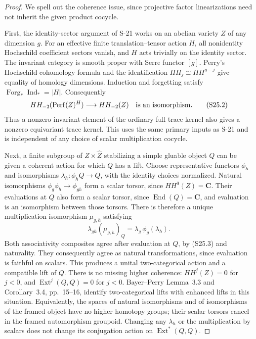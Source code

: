 \begin{proof}
We spell out the coherence issue, since projective factor
linearizations need not inherit the given product cocycle.

First, the identity-sector argument of S-21 works on an
abelian variety $Z$ of any dimension $g$. For an effective
finite translation--tensor action $H$, all nonidentity
Hochschild coefficient sectors vanish, and $H$ acts
trivially on the identity sector. The invariant category
is smooth proper with Serre functor $[g]$. Perry's
Hochschild-cohomology formula and the identification
$HH_j\cong HH^{g-j}$ give equality of homology dimensions.
Induction and forgetting satisfy
$\operatorname{Forg}_*\operatorname{Ind}_*=|H|$.
Consequently
\[
 HH_{-2}(\operatorname{Perf}(Z)^H)
   \longrightarrow HH_{-2}(Z)
 \quad\hbox{is an isomorphism}.
 \tag{S25.2}
\]
Thus a nonzero invariant element of the ordinary full
trace kernel also gives a nonzero equivariant trace kernel.
This uses the same primary inputs as S-21 and is
independent of any choice of scalar multiplication cocycle.

Next, a finite subgroup of $Z\times\widehat Z$ stabilizing
a simple gluable object $Q$ can be given a coherent action
for which $Q$ has a lift. Choose representative functors
$\phi_h$ and isomorphisms $\lambda_h:\phi_hQ\to Q$,
with the identity choices normalized. Natural isomorphisms
$\phi_g\phi_h\to\phi_{gh}$ form a scalar torsor,
since $HH^0(Z)=\mathbf C$. Their evaluations at $Q$ also
form a scalar torsor, since $\operatorname{End}(Q)=\mathbf C$,
and evaluation is an isomorphism between those torsors.
There is therefore a unique multiplication isomorphism
$\mu_{g,h}$ satisfying
\[
 \lambda_{gh}(\mu_{g,h})_Q
       =\lambda_g\,\phi_g(\lambda_h).
 \tag{S25.3}
\]
Both associativity composites agree after evaluation at
$Q$, by (S25.3) and naturality. They consequently agree as natural
transformations, since evaluation is faithful on scalars.
This produces a unital two-categorical action and a
compatible lift of $Q$.
There is no missing higher coherence: $HH^j(Z)=0$ for
$j<0$, and $\operatorname{Ext}^j(Q,Q)=0$ for $j<0$.
Bayer--Perry Lemma~3.3 and Corollary~3.4, pp.~15--16,
identify two-categorical lifts with enhanced lifts in
this situation. Equivalently, the spaces of natural
isomorphisms and of isomorphisms of the framed object
have no higher homotopy groups; their scalar torsors
cancel in the framed automorphism groupoid.
Changing any $\lambda_h$ or the multiplication by
scalars does not change its conjugation action on
$\operatorname{Ext}^*(Q,Q)$.


\end{proof}
